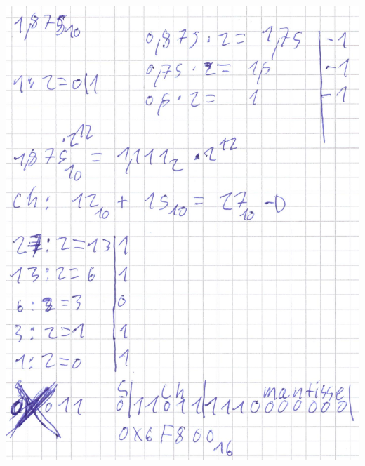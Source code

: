 \documentclass{article}
\begin{document}
	\includegraphics[width=\linewidth]{"95a2"} \\
\end{document}
